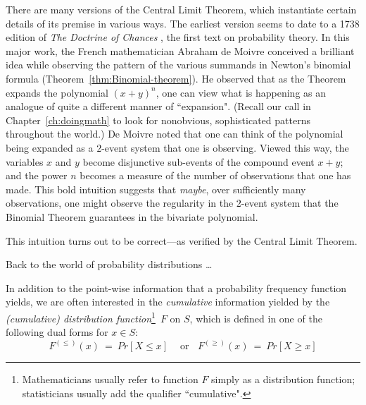 \bigskip


There are many versions of the Central Limit Theorem, which instantiate certain details of its premise in various ways.  The earliest version seems to date to a 1738 edition of {\it The Doctrine of Chances} \cite{DeMoivre}, the first text on probability theory.  In this major work, the French mathematician Abraham de Moivre conceived a brilliant idea while observing the pattern of the various summands in Newton's binomial formula (Theorem~\ref{thm:Binomial-theorem}).  He observed that as the Theorem expands the polynomial $(x+y)^n$, one can view what is happening as an analogue of quite a different manner of ``expansion".  (Recall our call in Chapter~\ref{ch:doingmath} to look for nonobvious, sophisticated patterns throughout the world.)  De Moivre noted that one can think of the polynomial being expanded as a $2$-event system that one is observing.  Viewed this way, the variables $x$ and $y$ become disjunctive sub-events of the compound event $x+y$; and the power $n$ becomes a measure of the number of observations that one has made.  This bold intuition suggests that {\em maybe}, over sufficiently many observations, one might observe the regularity in the $2$-event system that the Binomial Theorem guarantees in the bivariate polynomial.

\smallskip

\noindent
This intuition turns out to be correct---as verified by the Central Limit Theorem.

\bigskip

\noindent Back to the world of probability distributions \ldots

\medskip

 

In addition to the point-wise information that a probability frequency function yields, we are
often interested in the {\em cumulative} information yielded by the {\it (cumulative) distribution function}\footnote{Mathematicians usually refer to function $F$ simply as a distribution function; statisticians usually add the qualifier ``cumulative".}~$F$ on $S$, which is defined in one of the following dual forms for $x \in S$:
\[ F^{(\leq)}(x) \ = \ Pr[X \leq x] \ \ \ \ \mbox{ or} \ \ \ \  F^{(\geq)}(x) \ = \ Pr[X \geq x]\]

\smallskip

